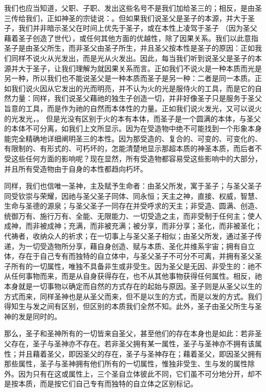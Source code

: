 我们也应当知道，父职、子职、发出这些名号不是我们加给圣三的；相反，是由圣三传给我们，正如神圣的宗徒说：。但如果我们说圣父是圣子的本源，并大于圣子，我们并非暗示圣父在时间上优先于圣子，或在本性上凌驾于圣子 （因为圣父藉着圣子创造了世代），或任何其他方面的优越性，除了因果关系。我们以此意指圣子是由圣父所生，而非圣父由圣子所生，并且圣父按本性是圣子的原因：正如我们同样不说火从光发出，而是光从火发出。因此，每当我们听到说圣父是圣子的本源并大于圣子，让我们理解为就因果关系而言。正如我们不说火是一种本质而光是另一种，所以我们也不能说圣父是一种本质而圣子是另一种：二者是同一本质。正如我们说火因从它发出的光而明亮，并不认为火的光是服侍火的工具，而是它的自然力量：同样，我们说圣父藉祂的独生子创造一切，并非好像圣子只是服务于圣父旨意的工具，而是作为祂的自然而本体性的力量。正如我们说火发光，又可以说火的光发光，。 但是光没有区别于火的本有本体，而圣子是一个圆满的本体，与圣父的本体不可分离，如我们上文所显示。因为在受造物中绝不可能找到一个形象本身能完全精确地详细阐明圣三的本性。因为那受造的、复合的、可变的、可变化的、有限制的、有形式的、可朽坏的，怎能清楚地显示那超本质的神圣本质，而后者不受这些任何方面的影响呢？现在显然，所有受造物都容易受这些影响中的大部分，并且所有受造物由于自身的本性都趋向朽坏。\par

同样，我们也信唯一圣神，主及赋予生命者：由圣父所发，寓于圣子；与圣父圣子同受钦崇与荣耀，因祂与圣父圣子同体、同永恒；天主之神，直接、权威，智慧、生命与圣德的源泉；与圣父圣子一同存在并受呼求的天主；非受造、圆满、创造、统御万有、施行万有、全能、无限能力、一切受造之主，而非受制于任何主；使人成神，而非被成神；充满，而非被充满；被分享，而非分享；圣化，而非被圣化；代祷者，收纳众人的祈求；在一切事上与圣父圣子相似；由圣父所发，通过圣子传递，为一切受造物所分享，藉自身创造、赋与本质、圣化并维系宇宙；拥有自立体，存在于自己专有而独特的自立体中，与圣父圣子不可分不可离，并拥有圣父圣子所有的一切属性，唯独不具备非生或非受生。因为圣父是无因、非受生的：祂不从任何事物而来，而是从自身获得存在，也不从其他事物获得任何属性。相反，祂本身就是一切事物以确定而自然的方式存在的起始与原因。圣子则是从圣父以生的方式而来，同样圣神也是从圣父而来，但不是以生的方式，而是以发的方式。我们得知生与发之间有区别，但区别的本质我们全然不知。此外，圣子由圣父所生与圣神的发是同时的。\par

那么，圣子和圣神所有的一切皆来自圣父，甚至他们的存在本身也是如此：若非圣父存在，圣子与圣神亦不存在。若非圣父拥有某一属性，圣子与圣神亦不拥有该属性；并且藉着圣父，即因圣父的存在，圣子与圣神存在；藉着圣父，即因圣父拥有那些属性，圣子与圣神拥有他们所有的一切属性，惟独非受生、生与发的属性除外。因为只有在这或属性上，三个圣自立体彼此不同，它们虽不可分地分开，却不是按本质，而是按它们自己专有而独特的自立体之区别标记。\par

